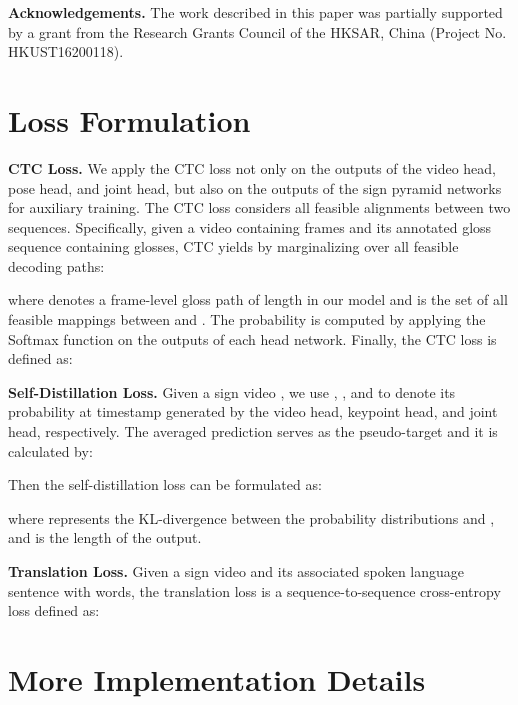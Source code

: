 \documentclass{article}
\begin{document}
\textbf{Acknowledgements.} The work described in this paper was partially supported by a grant from the Research Grants Council of the HKSAR, China (Project No. HKUST16200118).

 

\small



\appendix

\section{Loss Formulation}
\textbf{CTC Loss.} We apply the CTC loss \cite{graves2006connectionist} not only on the outputs of the video head, pose head, and joint head, but also on the outputs of the sign pyramid networks for auxiliary training. The CTC loss considers all feasible alignments between two sequences.
Specifically, given a video  containing  frames and its annotated gloss sequence  containing  glosses, CTC yields  by marginalizing over all feasible decoding paths:

where  denotes a frame-level gloss path of length  in our model and  is the set of all feasible mappings between  and .
The probability  is computed by applying the Softmax function on the outputs of each head network. 
Finally, the CTC loss is defined as:


\textbf{Self-Distillation Loss.} Given a sign video , we use , , and  to denote its probability at timestamp  generated by the video head, keypoint head, and joint head, respectively. The averaged prediction  serves as the pseudo-target and it is calculated by:

Then the self-distillation loss  can be formulated as:

where  represents the KL-divergence between the probability distributions  and , and  is the length of the output.

\textbf{Translation Loss.} Given a sign video  and its associated spoken language sentence  with  words, the translation loss  is a sequence-to-sequence cross-entropy loss defined as:



\section{More Implementation Details}
\end{document}
